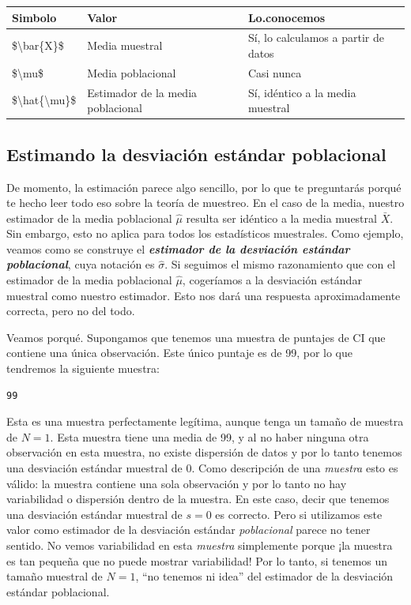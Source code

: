 \documentclass[spanish,]{book}
\begin{document}
\begin{tabular}{l|l|l}
\hline
Simbolo & Valor & Lo.conocemos\\
\hline
\$\textbackslash{}bar\{X\}\$ & Media muestral & Sí, lo calculamos a partir de datos\\
\hline
\$\textbackslash{}mu\$ & Media poblacional & Casi nunca\\
\hline
\$\textbackslash{}hat\{\textbackslash{}mu\}\$ & Estimador de la media poblacional & Sí, idéntico a la media muestral\\
\hline
\end{tabular}

\subsection{Estimando la desviación estándar
poblacional}\label{estimando-la-desviacion-estandar-poblacional}

De momento, la estimación parece algo sencillo, por lo que te
preguntarás porqué te hecho leer todo eso sobre la teoría de muestreo.
En el caso de la media, nuestro estimador de la media poblacional
\(\hat\mu\) resulta ser idéntico a la media muestral \(\bar{X}\). Sin
embargo, esto no aplica para todos los estadísticos muestrales. Como
ejemplo, veamos como se construye el \textbf{\emph{estimador de la
desviación estándar poblacional}}, cuya notación es \(\hat\sigma\). Si
seguimos el mismo razonamiento que con el estimador de la media
poblacional \(\hat\mu\), cogeríamos a la desviación estándar muestral
como nuestro estimador. Esto nos dará una respuesta aproximadamente
correcta, pero no del todo.

Veamos porqué. Supongamos que tenemos una muestra de puntajes de CI que
contiene una única observación. Este único puntaje es de 99, por lo que
tendremos la siguiente muestra:

\begin{verbatim}
99
\end{verbatim}

Esta es una muestra perfectamente legítima, aunque tenga un tamaño de
muestra de \(N=1\). Esta muestra tiene una media de 99, y al no haber
ninguna otra observación en esta muestra, no existe dispersión de datos
y por lo tanto tenemos una desviación estándar muestral de 0. Como
descripción de una \emph{muestra} esto es válido: la muestra contiene
una sola observación y por lo tanto no hay variabilidad o dispersión
dentro de la muestra. En este caso, decir que tenemos una desviación
estándar muestral de \(s = 0\) es correcto. Pero si utilizamos este
valor como estimador de la desviación estándar \emph{poblacional} parece
no tener sentido. No vemos variabilidad en esta \emph{muestra}
simplemente porque ¡la muestra es tan pequeña que no puede mostrar
variabilidad! Por lo tanto, si tenemos un tamaño muestral de \(N=1\),
``no tenemos ni idea'' del estimador de la desviación estándar
poblacional.
\end{document}
